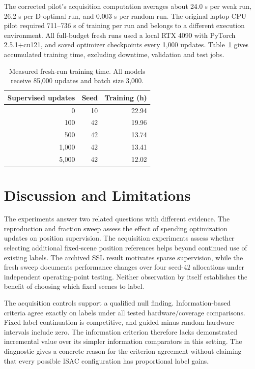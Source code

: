 \documentclass[conference]{IEEEtran}
\begin{document}
The corrected pilot's acquisition computation averages about 24.0 s per weak run, 26.2 s per D-optimal run, and 0.003 s per random run. The original laptop CPU pilot required 711--736 s of training per run and belongs to a different execution environment. All full-budget fresh runs used a local RTX 4090 with PyTorch 2.5.1+cu121, and saved optimizer checkpoints every 1,000 updates. Table~\ref{tab:runtime-final} gives accumulated training time, excluding downtime, validation and test jobs.
\begin{table}[t]\centering\small
\caption{Measured fresh-run training time. All models receive 85,000 updates and batch size 3,000.}\label{tab:runtime-final}
\setlength{\tabcolsep}{3pt}
\begin{tabular}{rrr}\toprule
Supervised updates & Seed & Training (h)\\\midrule
0 & 10 & 22.94\\
100 & 42 & 19.96\\
500 & 42 & 13.74\\
1,000 & 42 & 13.41\\
5,000 & 42 & 12.02\\
\bottomrule\end{tabular}
\end{table}
\section{Discussion and Limitations}
The experiments answer two related questions with different evidence. The reproduction and fraction sweep assess the effect of spending optimization updates on position supervision. The acquisition experiments assess whether selecting additional fixed-scene position references helps beyond continued use of existing labels. The archived SSL result motivates sparse supervision, while the fresh sweep documents performance changes over four seed-42 allocations under independent operating-point testing. Neither observation by itself establishes the benefit of choosing which fixed scenes to label.

The acquisition controls support a qualified null finding. Information-based criteria agree exactly on labels under all tested hardware/coverage comparisons. Fixed-label continuation is competitive, and guided-minus-random hardware intervals include zero. The information criterion therefore lacks demonstrated incremental value over its simpler information comparators in this setting. The diagnostic gives a concrete reason for the criterion agreement without claiming that every possible ISAC configuration has proportional label gains.
\end{document}
